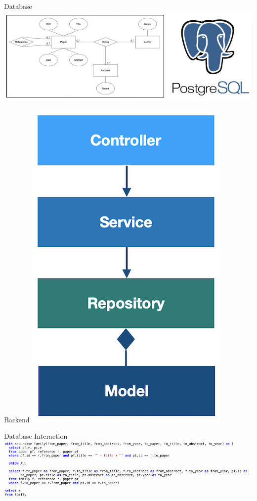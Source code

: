 \documentclass{beamer}
\begin{document}
\begin{frame}{Database}
    \includegraphics{img_07.png}
\end{frame}

\begin{frame}{Backend}
    \includegraphics{img_08.png}
\end{frame}

\begin{frame}{Database Interaction}
    \includegraphics{img_09.png}
\end{frame}
\end{document}
